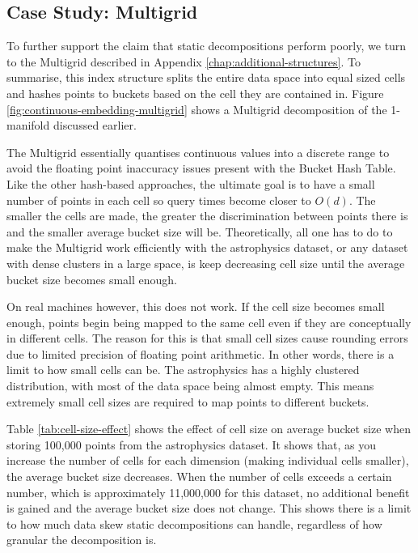 \subsection{Case Study: Multigrid}

To further support the claim that static decompositions perform poorly, we turn to the Multigrid described in Appendix \ref{chap:additional-structures}. To summarise, this index structure splits the entire data space into equal sized cells and hashes points to buckets based on the cell they are contained in. Figure \ref{fig:continuous-embedding-multigrid} shows a Multigrid decomposition of the 1-manifold discussed earlier.

The Multigrid essentially quantises continuous values into a discrete range to avoid the floating point inaccuracy issues present with the Bucket Hash Table. Like the other hash-based approaches, the ultimate goal is to have a small number of points in each cell so query times become closer to $O(d)$.  The smaller the cells are made, the greater the discrimination between points there is and the smaller average bucket size will be. Theoretically, all one has to do to make the Multigrid work efficiently with the astrophysics dataset, or any dataset with dense clusters in a large space, is keep decreasing cell size until the average bucket size becomes small enough.

On real machines however, this does not work. If the cell size becomes small enough, points begin being mapped to the same cell even if they are conceptually in different cells. The reason for this is that small cell sizes cause rounding errors due to limited precision of floating point arithmetic. In other words, there is a limit to how small cells can be. The astrophysics has a highly clustered distribution, with most of the data space being almost empty. This means extremely small cell sizes are required to map points to different buckets.

Table \ref{tab:cell-size-effect} shows the effect of cell size on average bucket size when storing 100,000 points from the astrophysics dataset. It shows that, as you increase the number of cells for each dimension (making individual cells smaller), the average bucket size decreases. When the number of cells exceeds a certain number, which is approximately 11,000,000 for this dataset, no additional benefit is gained and the average bucket size does not change.  This shows there is a limit to how much data skew static decompositions can handle, regardless of how granular the decomposition is.

